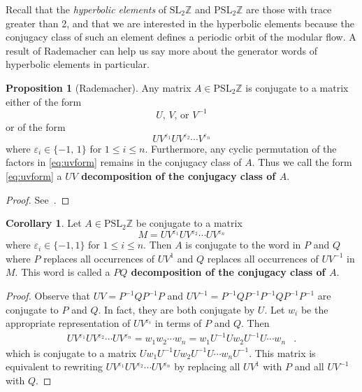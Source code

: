 \documentclass[12pt,twoside]{reedthesis}
\theoremstyle{definition}
\newtheorem{cor}[thm]{Corollary}
\newtheorem{prop}[thm]{Proposition}
\newcommand{\Z}{\mathbb{Z}}
\newcommand{\SLZ}{\mathrm{SL}_2{\Z}}
\newcommand{\PSLZ}{\mathrm{PSL}_2{\Z}}
\newcommand{\defnphrase}[1]{\textbf{#1}}
\begin{document}
Recall that the \emph{hyperbolic elements} of $\SLZ$ and $\PSLZ$ are those with trace greater than 2, and that we are interested in the hyperbolic elements because the conjugacy class of such an element defines a periodic orbit of the modular flow. A result of Rademacher can help us say more about the generator words of hyperbolic elements in particular.

\begin{prop}[Rademacher]
  Any matrix $A \in \PSLZ$ is conjugate to a matrix either of the form
  \begin{equation}\label{eq:uvform_elliptic}
    \text{$U$, $V$, or $V^{-1}$}
  \end{equation}
  or of the form
  \begin{equation}\label{eq:uvform}
    U V^{\varepsilon_1} U V^{\varepsilon_2} \cdots V^{\varepsilon_{n}}
  \end{equation}
  where $\varepsilon_i \in \{-1,\, 1\}$ for $1 \leq i \leq n$.
  Furthermore, any cyclic permutation of the factors in \eqref{eq:uvform} remains in the conjugacy class of $A$.
  Thus we call the form \eqref{eq:uvform} a \defnphrase{$UV$ decomposition of the conjugacy class of $A$}.
\end{prop}

\begin{proof}
  See~\cite[56--57]{rademacher1972}.
\end{proof}

\vspace{0.5em}  %
\begin{cor}\label{prop:pq_decomposition}
  Let $A \in \PSLZ$ be conjugate to a matrix
  \begin{equation*}
    M = UV^{\varepsilon_1} UV^{\varepsilon_2} \cdots UV^{\varepsilon_n}
  \end{equation*}
  where $\varepsilon_i \in \{-1, 1\}$ for $1 \leq i \leq n$.
  Then $A$ is conjugate to the word in $P$ and $Q$ where $P$ replaces all occurrences of $UV^1$ and $Q$ replaces all occurrences of $UV^{-1}$ in $M$.
  This word is called a \defnphrase{$PQ$ decomposition of the conjugacy class of $A$}.
\end{cor}

\begin{proof}
  Observe that $UV = P^{-1}QP^{-1}P$ and $UV^{-1} = P^{-1}QP^{-1}P^{-1}QP^{-1}P^{-1}$ are conjugate to $P$ and $Q$.
  In fact, they are both conjugate by $U$.
  Let $w_i$ be the appropriate representation of $UV^{\varepsilon_i}$ in terms of $P$ and $Q$.
  Then
  \begin{align*}
    UV^{\varepsilon_1} UV^{\varepsilon_2} \cdots UV^{\varepsilon_n} = w_1 w_2 \cdots w_n = w_1 U^{-1} U w_2 U^{-1} U \cdots w_n
    &.
  \end{align*}
  which is conjugate to a matrix $U w_1 U^{-1} U w_2 U^{-1} U \cdots w_n U^{-1}$.
  This matrix is equivalent to rewriting $UV^{\varepsilon_1} UV^{\varepsilon_2} \cdots UV^{\varepsilon_n}$ by replacing all $UV^1$ with $P$ and all $UV^{-1}$ with $Q$.
\end{proof}
\end{document}
